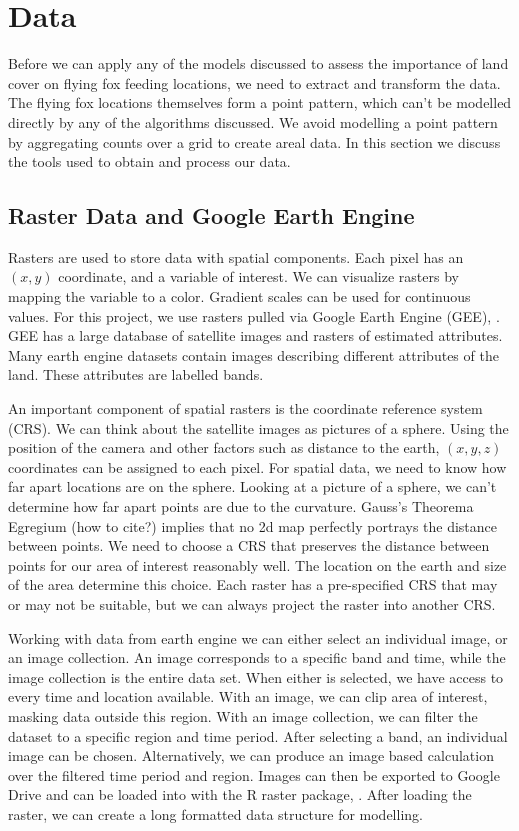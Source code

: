 \documentclass[
  12pt,
  letterpaper,
  DIV=11,
  numbers=noendperiod]{scrartcl}
\begin{document}
\section{Data}\label{sec:Data}

Before we can apply any of the models discussed to assess the importance
of land cover on flying fox feeding locations, we need to extract and
transform the data. The flying fox locations themselves form a point
pattern, which can't be modelled directly by any of the algorithms
discussed. We avoid modelling a point pattern by aggregating counts over
a grid to create areal data. In this section we discuss the tools used
to obtain and process our data.

\subsection{Raster Data and Google Earth
Engine}\label{raster-data-and-google-earth-engine}

Rasters are used to store data with spatial components. Each pixel has
an \((x,y)\) coordinate, and a variable of interest. We can visualize
rasters by mapping the variable to a color. Gradient scales can be used
for continuous values. For this project, we use rasters pulled via
Google Earth Engine (GEE), \citep{gee}. GEE has a large database of
satellite images and rasters of estimated attributes. Many earth engine
datasets contain images describing different attributes of the land.
These attributes are labelled bands.

An important component of spatial rasters is the coordinate reference
system (CRS). We can think about the satellite images as pictures of a
sphere. Using the position of the camera and other factors such as
distance to the earth, \((x,y,z)\) coordinates can be assigned to each
pixel. For spatial data, we need to know how far apart locations are on
the sphere. Looking at a picture of a sphere, we can't determine how far
apart points are due to the curvature. Gauss's Theorema Egregium (how to
cite?) implies that no 2d map perfectly portrays the distance between
points. We need to choose a CRS that preserves the distance between
points for our area of interest reasonably well. The location on the
earth and size of the area determine this choice. Each raster has a
pre-specified CRS that may or may not be suitable, but we can always
project the raster into another CRS.

Working with data from earth engine we can either select an individual
image, or an image collection. An image corresponds to a specific band
and time, while the image collection is the entire data set. When either
is selected, we have access to every time and location available. With
an image, we can clip area of interest, masking data outside this
region. With an image collection, we can filter the dataset to a
specific region and time period. After selecting a band, an individual
image can be chosen. Alternatively, we can produce an image based
calculation over the filtered time period and region. Images can then be
exported to Google Drive and can be loaded into with the R raster
package, \citep{raster}. After loading the raster, we can create a long
formatted data structure for modelling.
\end{document}
